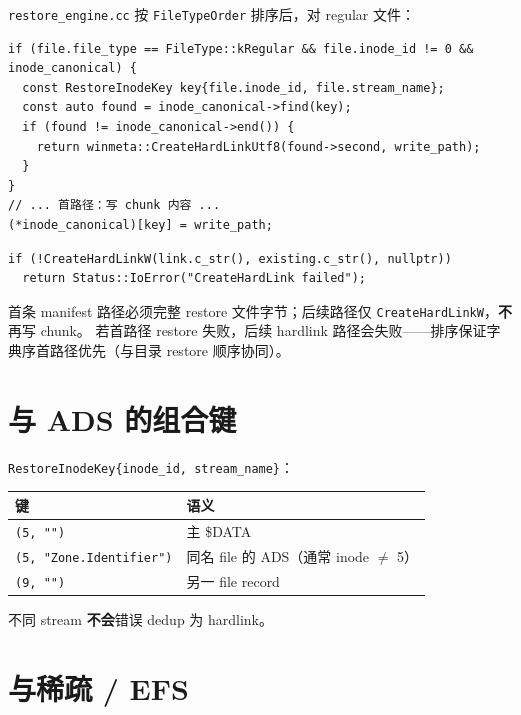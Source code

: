 \texttt{restore\_engine.cc} 按 \texttt{FileTypeOrder} 排序后，对 regular 文件：

\begin{lstlisting}[caption={硬链恢复逻辑 (restore\_engine.cc)}]
if (file.file_type == FileType::kRegular && file.inode_id != 0 && inode_canonical) {
  const RestoreInodeKey key{file.inode_id, file.stream_name};
  const auto found = inode_canonical->find(key);
  if (found != inode_canonical->end()) {
    return winmeta::CreateHardLinkUtf8(found->second, write_path);
  }
}
// ... 首路径：写 chunk 内容 ...
(*inode_canonical)[key] = write_path;
\end{lstlisting}

\begin{lstlisting}[caption={CreateHardLinkUtf8 (win\_meta.cc)}]
if (!CreateHardLinkW(link.c_str(), existing.c_str(), nullptr))
  return Status::IoError("CreateHardLink failed");
\end{lstlisting}

\begin{designbox}
首条 manifest 路径必须完整 restore 文件字节；后续路径仅 \texttt{CreateHardLinkW}，\textbf{不}再写 chunk。
若首路径 restore 失败，后续 hardlink 路径会失败——排序保证字典序首路径优先（与目录 restore 顺序协同）。
\end{designbox}

\section{与 ADS 的组合键}

\texttt{RestoreInodeKey\{inode\_id, stream\_name\}}：

\begin{center}
\begin{tabular}{@{}ll@{}}
\toprule
键 & 语义 \\
\midrule
\texttt{(5, "")} & 主 \$DATA \\
\texttt{(5, "Zone.Identifier")} & 同名 file 的 ADS（通常 inode $\neq$ 5） \\
\texttt{(9, "")} & 另一 file record \\
\bottomrule
\end{tabular}
\end{center}

不同 stream \textbf{不会}错误 dedup 为 hardlink。

\section{与稀疏 / EFS}

